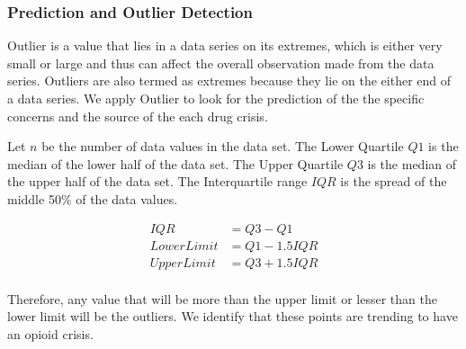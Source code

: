 \documentclass{mcmthesis}
\begin{document}



\subsubsection{Prediction and Outlier Detection}

Outlier is a value that lies in a data series on its extremes, which is either very small or large and thus can affect the overall observation made from the data series. Outliers are also termed as extremes because they lie on the either end of a data series. We apply Outlier to look for the prediction of the the specific concerns and the source of the each drug crisis.  

Let $n$ be the number of data values in the data set. The Lower Quartile $Q1$ is the median of the lower half of the data set. The Upper Quartile $Q3$ is the median of the upper half of the data set. The Interquartile range $IQR$ is the spread of the middle 50\% of the data values.

\begin{equation}
\begin{aligned}
    IQR &= Q3-Q1 \\
    Lower Limit &= Q1-1.5IQR \\
    Upper Limit &= Q3+1.5IQR \\
\end{aligned}
\end{equation}

Therefore, any value that will be more than the upper limit or lesser than the lower limit will be the outliers. We identify that these points are trending to have an opioid crisis.
\end{document}
